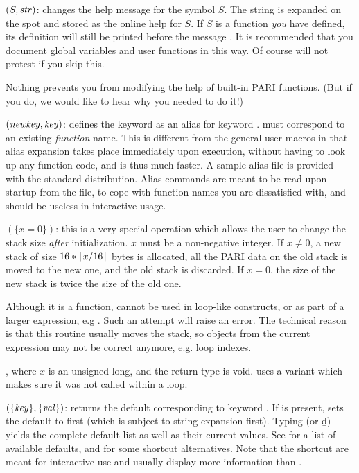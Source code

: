 $(S,\hbox{\it str\/})$:\label{se:addhelp} changes the help
message for the symbol $S$. The string  is expanded on the spot
and stored as the online help for $S$. If $S$ is a function \emph{you} have
defined, its definition will still be printed before the message .
It is recommended that you document global variables and user functions in
this way. Of course  will not protest if you skip this.

Nothing prevents you from modifying the help of built-in PARI
functions. (But if you do, we would like to hear why you needed to do it!)

$(\hbox{\it newkey\/},\hbox{\it key\/})$: defines the keyword
 as an alias for keyword .  must correspond
to an existing \emph{function} name. This is different from the general user
macros in that alias expansion takes place immediately upon execution,
without having to look up any function code, and is thus much faster. A
sample alias file  is provided with the standard
distribution. Alias commands are meant to be read upon startup from the
 file, to cope with function names you are dissatisfied with, and
should be useless in interactive usage.

$(\{x=0\})$: this is a very special operation which
allows the user to change the stack size \emph{after} initialization. $x$
must be a non-negative integer. If $x \neq 0$, a new stack of size
$16*\left\lceil x/16 \right\rceil$ bytes is allocated, all the PARI data on the old stack is
moved to the new one, and the old stack is discarded. If $x=0$, the size of
the new stack is twice the size of the old one.

Although it is a function,  cannot be used in loop-like
constructs, or as part of a larger expression, e.g .
Such an attempt will raise an error. The technical reason is that this
routine usually moves the stack, so objects from the current expression may
not be correct anymore, e.g. loop indexes.

, where $x$ is an unsigned long, and the return type
is void.  uses a variant which makes sure it was not called within a
loop.

$(\{\hbox{\it key\/}\},\{\hbox{\it val\/}\})$: returns
the default corresponding to keyword . If  is present,
sets the default to  first (which is subject to string expansion
first). Typing  (or \b{d}) yields the complete default
list as well as their current values.\label{se:default}
See  for a list of available defaults, and
 for some shortcut alternatives. Note that the shortcut
are meant for interactive use and usually display more information than
.

